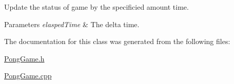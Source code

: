 Update the status of game by the specificied amount time. 


\begin{DoxyParams}{Parameters}
{\em elasped\+Time} & The delta time. \\
\hline
\end{DoxyParams}


The documentation for this class was generated from the following files\+:\begin{DoxyCompactItemize}
\item 
\hyperlink{PongGame_8h}{Pong\+Game.\+h}\item 
\hyperlink{PongGame_8cpp}{Pong\+Game.\+cpp}\end{DoxyCompactItemize}
